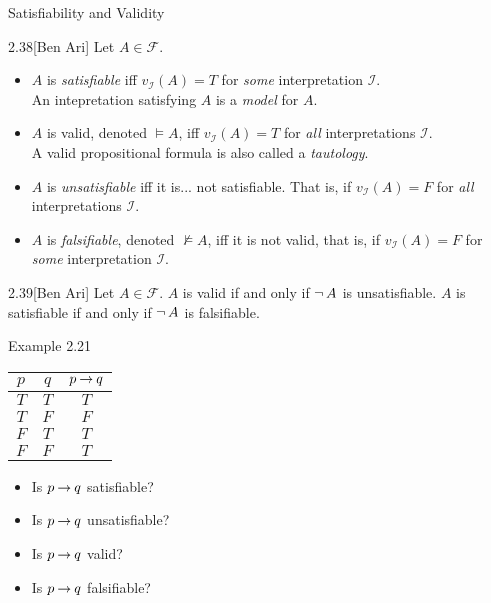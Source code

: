 \documentclass[style=sailor,size=12pt]{powerdot}
\begin{document}
\begin{wideslide}[bm=,toc=]{Satisfiability and Validity}
\begin{defn}{2.38}[Ben Ari]
Let $A \in \mathcal{F}$.
\begin{itemize}
\item $A$ is \emph{satisfiable} iff $v_{\mathcal{I}}(A) = T$ for \emph{some}
      interpretation $\mathcal{I}$.\\
      An intepretation satisfying $A$ is a \emph{model} for $A$.

\item $A$ is valid, denoted $\models A$, iff $v_{\mathcal{I}}(A)=T$ for
      \emph{all} interpretations $\mathcal{I}$.\\
      A valid propositional formula is also called a \emph{tautology}.

\item $A$ is \emph{unsatisfiable} iff it is... not satisfiable. That is, if
      $v_{\mathcal{I}}(A) = F$ for \emph{all} interpretations $\mathcal{I}$.

\item $A$ is \emph{falsifiable}, denoted $\not\models A$, iff it is not valid,
      that is, if $v_{\mathcal{I}}(A) = F$ for \emph{some} interpretation
      $\mathcal{I}$.
\end{itemize}
\end{defn}
\begin{thm}{2.39}[Ben Ari]
Let $A \in \mathcal{F}$. $A$ is valid if and only if $\mathop{\neg} A$ is unsatisfiable.
$A$ is satisfiable if and only if $\mathop{\neg} A$ is falsifiable.
\end{thm}
\end{wideslide}


\begin{wideslide}[bm=,toc=]{Example 2.21}
\begin{center}
\begin{tabular}{|c|c||c|}
\hline
$p$ & $q$ & $p \mathbin{\rightarrow} q$ \\ \hline \hline
$T$ & $T$ & $T$  \\ \hline
$T$ & $F$ & $F$  \\ \hline
$F$ & $T$ & $T$  \\ \hline
$F$ & $F$ & $T$  \\ \hline
\end{tabular}
\end{center}
\begin{itemize}
\item Is $p \mathbin{\rightarrow} q$ satisfiable?
\item Is $p \mathbin{\rightarrow} q$ unsatisfiable?
\item Is $p \mathbin{\rightarrow} q$ valid?
\item Is $p \mathbin{\rightarrow} q$ falsifiable?
\end{itemize}
\end{wideslide}
\end{document}
